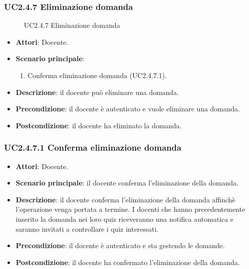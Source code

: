 \subsubsection{UC2.4.7 Eliminazione domanda}
\begin{figure}[H]
\centering
\noindent{}
\caption{UC2.4.7 Eliminazione domanda}
\end{figure}
\begin{itemize}
\item \textbf{Attori}: Docente.
\item \textbf{Scenario principale}:
\begin{enumerate}
\item Conferma eliminazione domanda (UC2.4.7.1).
\end{enumerate}
\item \textbf{Descrizione}: il docente può eliminare una domanda.
\item \textbf{Precondizione}: il docente è autenticato e vuole eliminare  una domanda.
\item \textbf{Postcondizione}: il docente ha eliminato la domanda.
\end{itemize}
\subsubsection{UC2.4.7.1 Conferma eliminazione domanda}
\begin{itemize}
\item \textbf{Attori}: Docente.
\item \textbf{Scenario principale}: il docente conferma l'eliminazione della domanda.
\item \textbf{Descrizione}: il docente conferma l'eliminazione della domanda affinchè l'operazione venga portata a termine. I docenti che hanno precedentemente inserito la domanda nei loro quiz riceveranno una notifica automatica e saranno invitati a controllare i quiz interessati.
\item \textbf{Precondizione}: il docente è autenticato e sta gestendo le domande.
\item \textbf{Postcondizione}: il docente ha confermato l'eliminazione della domanda.
\end{itemize}
